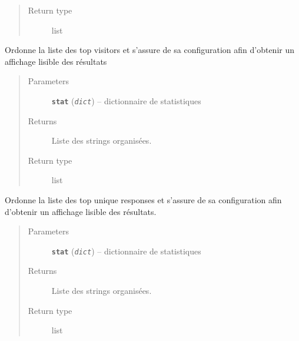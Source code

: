 \documentclass[letterpaper,10pt,english]{sphinxmanual}
\begin{document}
\begin{fulllineitems}
\begin{fulllineitems}
\begin{quote}
\begin{description}
\item[{Return type}] \leavevmode
list

\end{description}\end{quote}

\end{fulllineitems}


\begin{fulllineitems}
\label{loganalyser:loganalyser.diagnostique.Diagnostique.get_topvisitors}
Ordonne la liste des top visitors et s'assure de sa configuration afin d'obtenir un affichage lisible des
résultats
\begin{quote}\begin{description}
\item[{Parameters}] \leavevmode
\textbf{\texttt{stat}} (\emph{\texttt{dict}}) -- dictionnaire de statistiques

\item[{Returns}] \leavevmode
Liste des strings organisées.

\item[{Return type}] \leavevmode
list

\end{description}\end{quote}

\end{fulllineitems}


\begin{fulllineitems}
\label{loganalyser:loganalyser.diagnostique.Diagnostique.get_topuniqueresponses}
Ordonne la liste des top unique responses et s'assure de sa configuration afin d'obtenir un affichage lisible
des résultats.
\begin{quote}\begin{description}
\item[{Parameters}] \leavevmode
\textbf{\texttt{stat}} (\emph{\texttt{dict}}) -- dictionnaire de statistiques

\item[{Returns}] \leavevmode
Liste des strings organisées.

\item[{Return type}] \leavevmode
list


\end{description}
\end{quote}
\end{fulllineitems}
\end{fulllineitems}
\end{document}
